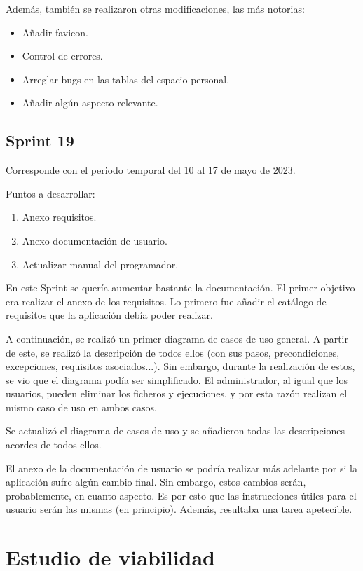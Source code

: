 Además, también se realizaron otras modificaciones, las más notorias:
\begin{itemize}
    \item Añadir favicon.
    \item Control de errores.
    \item Arreglar bugs en las tablas del espacio personal.
    \item Añadir algún aspecto relevante.
\end{itemize}


\subsection{Sprint 19}
Corresponde con el periodo temporal del 10 al 17 de mayo de 2023.

Puntos a desarrollar:
\begin{enumerate}
    \item Anexo requisitos.
    \item Anexo documentación de usuario.
    \item Actualizar manual del programador.
\end{enumerate}

En este Sprint se quería aumentar bastante la documentación. El primer objetivo
era realizar el anexo de los requisitos. Lo primero fue añadir el catálogo de
requisitos que la aplicación debía poder realizar.

A continuación, se realizó un primer diagrama de casos de uso general. A partir
de este, se realizó la descripción de todos ellos (con sus pasos,
precondiciones, excepciones, requisitos asociados...). Sin embargo, durante la
realización de estos, se vio que el diagrama podía ser simplificado. El
administrador, al igual que los usuarios, pueden eliminar los ficheros y
ejecuciones, y por esta razón realizan el mismo caso de uso en ambos casos. 

Se actualizó el diagrama de casos de uso y se añadieron todas las descripciones
acordes de todos ellos.

El anexo de la documentación de usuario se podría realizar más adelante por si
la aplicación sufre algún cambio final. Sin embargo, estos cambios serán,
probablemente, en cuanto aspecto. Es por esto que las instrucciones útiles para
el usuario serán las mismas (en principio). Además, resultaba una tarea
apetecible.

\section{Estudio de viabilidad}

